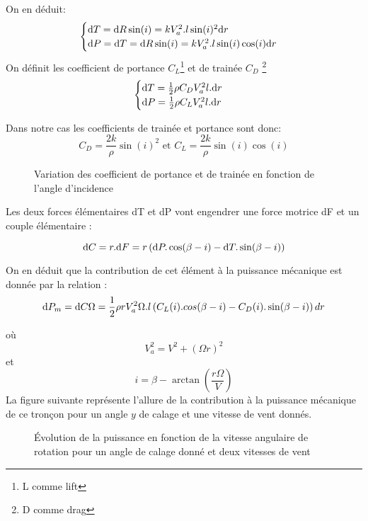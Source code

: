 \documentclass[main.tex]{subfiles}
\begin{document}
On en déduit:
\[
  \begin{cases}
    \mbox{d} T = \mbox{d} R \sin(i) = kV_a^2.l\sin(i)^2\mbox{d} r\\
    \mbox{d} P = \mbox{d} T = \mbox{d} R \sin(i) = kV_a^2.l\sin(i)\cos(i)\mbox{d} r
  \end{cases}
\]
On définit les coefficient de portance $C_L$\footnote{L comme lift} et de trainée $C_D$ \footnote{D comme drag}
\[
  \begin{cases}
    \mbox{d} T = \frac{1}{2}\rho C_D V_a^2l.\mbox{d} r \\
    \mbox{d} P = \frac{1}{2}\rho C_L V_a^2l.\mbox{d} r
  \end{cases}
\]
\begin{prop}
Dans notre cas les coefficients de trainée et portance sont donc:
\[
  C_D = \frac{2k}{\rho}\sin(i)^2 \text{ et } C_L = \frac{2k}{\rho}\sin(i)\cos(i)
\]
\end{prop}
\begin{figure}[H]
  \centering
  \caption{Variation des coefficient de portance et de trainée en fonction de l'angle d'incidence}
  \label{fig:plotcoef}
\end{figure}
Les deux forces élémentaires dT et dP vont engendrer une force motrice dF et un couple élémentaire :

\[
 \mbox{d} C= r.\mbox{d} F = r\left(\mbox{d} P.\cos(\beta-i)-\mbox{d} T.\sin(\beta-i)\right)
\]

On en déduit que la contribution de cet élément à la puissance mécanique est donnée par la relation :
\[
 \mbox{d} P_m = \mbox{d} C \Omega =\frac{1}{2}\rho r V_a^2\Omega.l\left(C_L(i).cos(\beta-i)-C_D(i).\sin(\beta-i)\right)dr
\]

où \[V_a^2 = V^2+(\Omega r)^2 \]
et \[i= \beta-\arctan\left(\frac{r\Omega}{V}\right)\]
La figure suivante représente l’allure de la contribution à la puissance mécanique de ce tronçon pour un angle $y$ de calage et une vitesse de vent donnés.

\begin{figure}[H]
  \centering
  \caption{Évolution de la puissance en fonction de la vitesse angulaire de rotation pour un angle de calage donné et deux vitesses de vent}
\end{figure}
\end{document}
